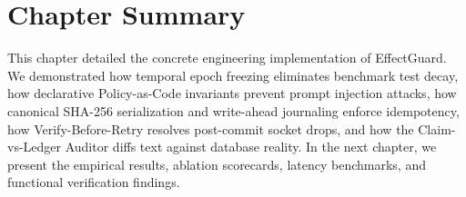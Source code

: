 \section{Chapter Summary}

This chapter detailed the concrete engineering implementation of EffectGuard. We demonstrated how temporal epoch freezing eliminates benchmark test decay, how declarative Policy-as-Code invariants prevent prompt injection attacks, how canonical SHA-256 serialization and write-ahead journaling enforce idempotency, how Verify-Before-Retry resolves post-commit socket drops, and how the Claim-vs-Ledger Auditor diffs text against database reality. In the next chapter, we present the empirical results, ablation scorecards, latency benchmarks, and functional verification findings.
